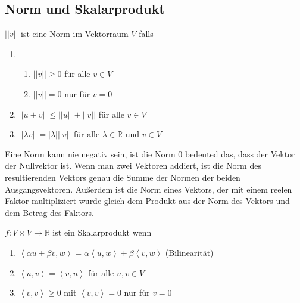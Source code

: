 


%
\subsection{Norm und Skalarprodukt}
\author{Vivien Thi, Max Braun, Luca Bohn}
\begin{Def}
$||v||$ ist eine Norm im Vektorraum $V$ falls
\begin{enumerate}
\item 
\begin{enumerate}
\item $||v|| \geq 0$ für alle $v \in V$
\item $||v|| = 0$ nur für $v = 0$
\end{enumerate}
\item $||u+v|| \leq ||u|| + ||v||$ für alle $v \in V$
\item $|| \lambda v|| = |\lambda| ||v||$ für alle $\lambda \in \mathbb{R}$ und $v \in V$
\end{enumerate}
\end{Def}
Eine Norm kann nie negativ sein, ist die Norm 0 bedeuted das, dass der Vektor der Nullvektor ist. Wenn man zwei Vektoren
addiert, ist die Norm des resultierenden Vektors genau die Summe der Normen der beiden Ausgangsvektoren. Außerdem ist die
Norm eines Vektors, der mit einem reelen Faktor multipliziert wurde gleich dem Produkt aus der Norm des Vektors und dem 
Betrag des Faktors.

\begin{Def}
$f:V\times V \rightarrow\mathbb{R}$ ist ein Skalarprodukt wenn\\
\begin{enumerate}
\item $\left\langle  \alpha u + \beta v, w\right\rangle = \alpha \left\langle  u,w\right\rangle + \beta \left\langle  v,w\right\rangle $ (Bilinearität)
\item $\left\langle  u,v\right\rangle = \left\langle  v,u\right\rangle $ für alle $u,v \in V$
\item $\left\langle  v,v\right\rangle \geq 0$ mit $\left\langle  v,v\right\rangle = 0$ nur für $v = 0$\\
\end{enumerate}
\end{Def}
 

